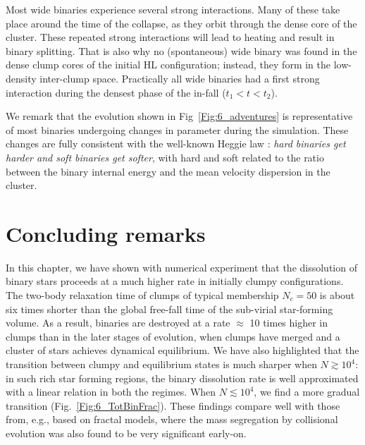 Most wide binaries experience several strong interactions. Many of these take place around the time of the collapse, as they orbit  through the dense core of the cluster. These repeated strong interactions will lead to heating and result in binary splitting. That is also why no (spontaneous) wide binary was found in  the  dense  clump cores of the initial HL configuration; instead, they form in the low-density inter-clump space. Practically all wide binaries had a first strong interaction during the densest phase of the in-fall ($t_1 < t < t_2$). 

We remark that the evolution shown in Fig~\ref{Fig:6_adventures} is representative of most binaries undergoing changes in parameter during the simulation. These changes are fully consistent with the well-known Heggie law \citep{Heggie1975,Hills1975}: \textit{hard binaries get harder and soft binaries get softer}, with hard and soft related to the ratio between the binary internal energy and the mean velocity dispersion in the cluster.



\section{Concluding remarks}


In this chapter, we have shown with numerical experiment that the dissolution of binary stars proceeds at a much higher rate in initially clumpy configurations. The two-body relaxation time of clumps of typical membership $N_c = 50 $ is about six times shorter than the global free-fall time of the sub-virial star-forming volume. As a result, binaries are destroyed at a rate $\approx $ 10 times higher in clumps than in the later stages of evolution, when clumps have merged and a cluster of stars achieves dynamical equilibrium. We have also highlighted that the transition between clumpy and equilibrium states is much sharper when $N \gtrsim 10^4$: in such rich star forming regions, the binary dissolution rate is well approximated with a linear relation in both the regimes. When $N \lesssim 10^4$, we find a more gradual transition (Fig.~\ref{Fig:6_TotBinFrac}). These findings  compare well with those from, e.g., \cite{Parker2011} based on fractal models, where the mass segregation by collisional evolution was also found to be very significant early-on. 


